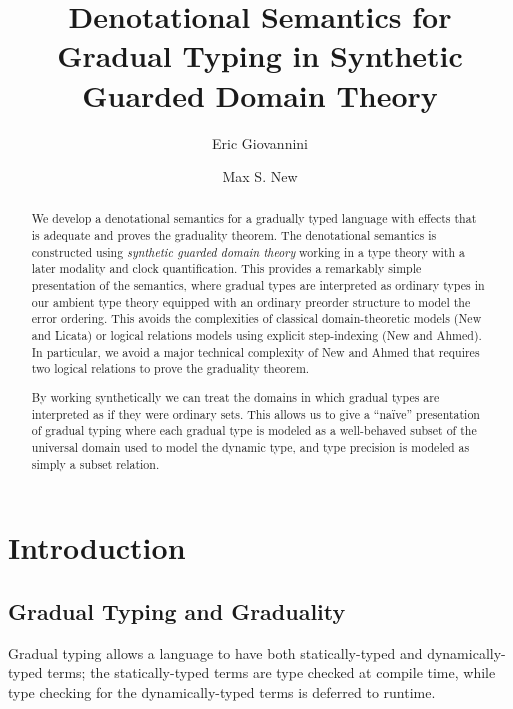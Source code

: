 \documentclass[acmsmall,screen]{acmart}
\begin{document}
\title{Denotational Semantics for Gradual Typing in Synthetic Guarded Domain Theory}
\author{Eric Giovannini}
\author{Max S. New}


\begin{abstract}
    We develop a denotational semantics for a gradually typed language
    with effects that is adequate and proves the graduality theorem.
    The denotational semantics is constructed using \emph{synthetic
    guarded domain theory} working in a type theory with a later
    modality and clock quantification.
    This provides a remarkably simple presentation of the semantics,
    where gradual types are interpreted as ordinary types in our ambient
    type theory equipped with an ordinary preorder structure to model
    the error ordering.
    This avoids the complexities of classical domain-theoretic models
    (New and Licata) or logical relations models using explicit
    step-indexing (New and Ahmed).
    In particular, we avoid a major technical complexity of New and
    Ahmed that requires two logical relations to prove the graduality
    theorem.
  
    By working synthetically we can treat the domains in which gradual
    types are interpreted as if they were ordinary sets. This allows us
    to give a ``na\"ive'' presentation of gradual typing where each
    gradual type is modeled as a well-behaved subset of the universal
    domain used to model the dynamic type, and type precision is modeled
    as simply a subset relation.
  \end{abstract}

  \maketitle
  
  \section{Introduction}
  
  \subsection{Gradual Typing and Graduality}
  Gradual typing allows a language to have both statically-typed and dynamically-typed terms;
  the statically-typed terms are type checked at compile time, while type checking for the 
  dynamically-typed terms is deferred to runtime.
\end{document}
